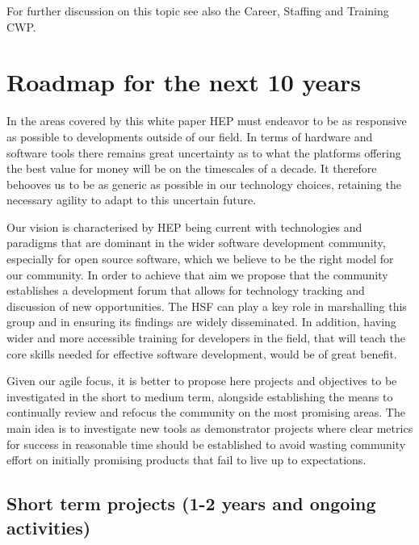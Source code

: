 \documentclass[12pt,a4paper]{article}
\begin{document}
For further discussion on this topic see also the Career, Staffing and
Training CWP.

\hypertarget{roadmap-for-the-next-10-years}{%
\section{Roadmap for the next 10
years}\label{roadmap-for-the-next-10-years}}

In the areas covered by this white paper HEP must endeavor to be as
responsive as possible to developments outside of our field. In terms of
hardware and software tools there remains great uncertainty as to what
the platforms offering the best value for money will be on the
timescales of a decade. It therefore behooves us to be as generic as
possible in our technology choices, retaining the necessary agility to
adapt to this uncertain future.

Our vision is characterised by HEP being current with technologies and
paradigms that are dominant in the wider software development community,
especially for open source software, which we believe to be the right
model for our community. In order to achieve that aim we propose that
the community establishes a development forum that allows for technology
tracking and discussion of new opportunities. The HSF can play a key
role in marshalling this group and in ensuring its findings are widely
disseminated. In addition, having wider and more accessible training for
developers in the field, that will teach the core skills needed for
effective software development, would be of great benefit.

Given our agile focus, it is better to propose here projects and
objectives to be investigated in the short to medium term, alongside
establishing the means to continually review and refocus the community
on the most promising areas. The main idea is to investigate new tools
as demonstrator projects where clear metrics for success in reasonable
time should be established to avoid wasting community effort on
initially promising products that fail to live up to expectations.

\hypertarget{short-term-projects-1-2-years-and-ongoing-activities}{%
\subsection{Short term projects (1-2 years and ongoing
activities)}\label{short-term-projects-1-2-years-and-ongoing-activities}}
\end{document}
